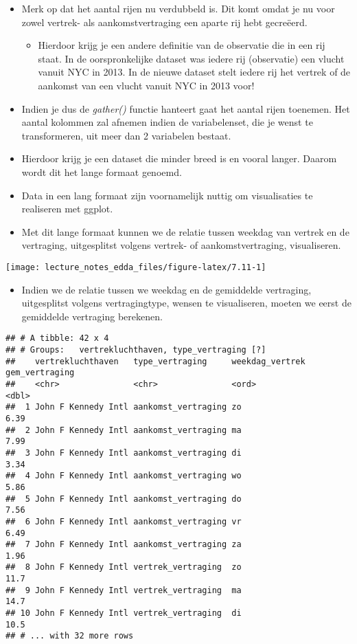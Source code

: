 \documentclass[]{memoir}
\providecommand{\tightlist}{%
  \setlength{\itemsep}{0pt}\setlength{\parskip}{0pt}}
\begin{document}
\begin{itemize}
\tightlist
\item
  Merk op dat het aantal rijen nu verdubbeld is. Dit komt omdat je nu
  voor zowel vertrek- als aankomstvertraging een aparte rij hebt
  gecreëerd.

  \begin{itemize}
  \tightlist
  \item
    Hierdoor krijg je een andere definitie van de observatie die in een
    rij staat. In de oorspronkelijke dataset was iedere rij (observatie)
    een vlucht vanuit NYC in 2013. In de nieuwe dataset stelt iedere rij
    het vertrek of de aankomst van een vlucht vanuit NYC in 2013 voor!
  \end{itemize}
\item
  Indien je dus de \emph{gather()} functie hanteert gaat het aantal
  rijen toenemen. Het aantal kolommen zal afnemen indien de
  variabelenset, die je wenst te transformeren, uit meer dan 2
  variabelen bestaat.
\item
  Hierdoor krijg je een dataset die minder breed is en vooral langer.
  Daarom wordt dit het lange formaat genoemd.
\item
  Data in een lang formaat zijn voornamelijk nuttig om visualisaties te
  realiseren met ggplot.
\item
  Met dit lange formaat kunnen we de relatie tussen weekdag van vertrek
  en de vertraging, uitgesplitst volgens vertrek- of aankomstvertraging,
  visualiseren.
\end{itemize}

\texttt{[image: lecture\_notes\_edda\_files/figure-latex/7.11-1]}

\begin{itemize}
\tightlist
\item
  Indien we de relatie tussen we weekdag en de gemiddelde vertraging,
  uitgesplitst volgens vertragingtype, wensen te visualiseren, moeten we
  eerst de gemiddelde vertraging berekenen.
\end{itemize}

\begin{verbatim}
## # A tibble: 42 x 4
## # Groups:   vertrekluchthaven, type_vertraging [?]
##    vertrekluchthaven   type_vertraging     weekdag_vertrek gem_vertraging
##    <chr>               <chr>               <ord>                    <dbl>
##  1 John F Kennedy Intl aankomst_vertraging zo                        6.39
##  2 John F Kennedy Intl aankomst_vertraging ma                        7.99
##  3 John F Kennedy Intl aankomst_vertraging di                        3.34
##  4 John F Kennedy Intl aankomst_vertraging wo                        5.86
##  5 John F Kennedy Intl aankomst_vertraging do                        7.56
##  6 John F Kennedy Intl aankomst_vertraging vr                        6.49
##  7 John F Kennedy Intl aankomst_vertraging za                        1.96
##  8 John F Kennedy Intl vertrek_vertraging  zo                       11.7 
##  9 John F Kennedy Intl vertrek_vertraging  ma                       14.7 
## 10 John F Kennedy Intl vertrek_vertraging  di                       10.5 
## # ... with 32 more rows
\end{verbatim}
\end{document}
